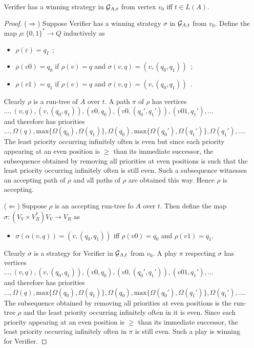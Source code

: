 \documentclass[runningheads,a4paper]{llncs}
\begin{document}
\begin{lemma}\label{lem:acceptance-game}
Verifier has a winning strategy in $\mathcal{G}_{A,t}$ from vertex $v_0$ iff $t \in L(A)$.
\end{lemma}

\begin{proof}
\noindent ($\Rightarrow$) Suppose Verifier has a winning strategy $\sigma$ in $\mathcal{G}_{A,t}$ from $v_0$. Define the map $\rho: \{0,1\}^* \to Q$ inductively as 
\begin{itemize}
\item $\rho(\varepsilon) = q_I$\ ;
\item $\rho(v0) = q_0$ if $\rho(v) = q$ and $\sigma(v,q) = (v,(q_0,q_1))$\ ;
\item $\rho(v1) = q_1$ if $\rho(v) = q$ and $\sigma(v,q) = (v,(q_0,q_1))$\ .
\end{itemize}
Clearly $\rho$ is a run-tree of $A$ over $t$. A path $\pi$ of $\rho$ has vertices \\
 $\ldots,(v,q), (v,(q_0,q_1)), (v0, q_0), (v0,(q_0',q_1')), (v01, q_1'),\ldots$ \\ and therefore has priorities\\
 $\ldots,\Omega(q), \mathrm{max}\{\Omega(q_0), \Omega(q_1)\}, \Omega(q_0), \mathrm{max}\{\Omega(q_0'), \Omega(q_1')\}, \Omega(q_1'),\ldots$.\\
The least priority occurring infinitely often is even but since each priority appearing at an even position is $\geq$ than its immediate successor, the subsequence obtained by removing all priorities at even positions is such that the least priority occurring infinitely often is still even. Such a subsequence witnesses an accepting path of $\rho$ and all paths of $\rho$ are obtained this way. Hence $\rho$ is accepting.

\noindent ($\Leftarrow$) Suppose $\rho$ is an accepting run-tree fo $A$ over $t$. Then define the map 
 $\sigma: (V_V \times V_R^*)V_V \to V_R$ as 
\begin{itemize}
\item $\sigma(\alpha (v,q)) = (v,(q_0,q_1))$ iff $\rho(v0) = q_0$ and $\rho(v1) = q_1$.
\end{itemize}
Clearly $\sigma$ is a strategy for Verifier in $\mathcal{G}_{A,t}$ from $v_0$. A play $\pi$ respecting $\sigma$ has vertices \\
 $\ldots,(v,q), (v,(q_0,q_1)), (v0, q_0), (v0,(q_0',q_1')), (v01, q_1'),\ldots$ \\ and therefore has priorities\\
 $\ldots,\Omega(q), \mathrm{max}\{\Omega(q_0), \Omega(q_1)\}, \Omega(q_0), \mathrm{max}\{\Omega(q_0'), \Omega(q_1')\}, \Omega(q_1'),\ldots$.\\
The subsequence obtained by removing all priorities at even positions is the run-tree $\rho$ and the least priority occurring infinitely often in it is even. Since each priority appearing at an even position is $\geq$ than its immediate successor, the least priority occurring infinitely often in $\pi$ is still even. Such a play is winning for Verifier.
\end{proof}

%
\end{document}
